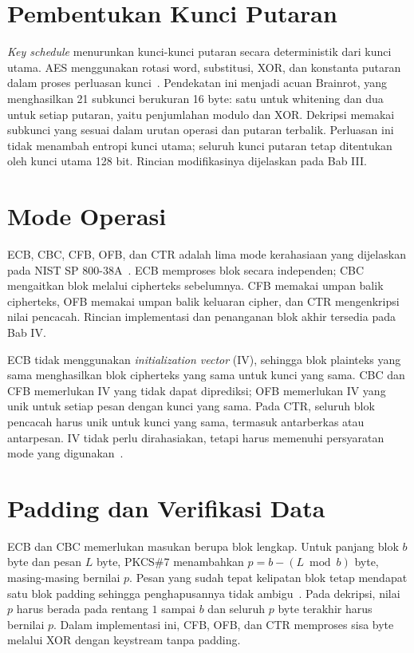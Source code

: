 \section{Pembentukan Kunci Putaran}
\textit{Key schedule} menurunkan kunci-kunci putaran secara deterministik
dari kunci utama. AES menggunakan rotasi word, substitusi, XOR, dan
konstanta putaran dalam proses perluasan kunci~\cite{aes}. Pendekatan ini
menjadi acuan Brainrot, yang menghasilkan 21 subkunci berukuran
16 byte: satu untuk whitening dan dua untuk setiap putaran, yaitu
penjumlahan modulo dan XOR. Dekripsi memakai subkunci yang sesuai
dalam urutan operasi dan putaran terbalik. Perluasan
ini tidak menambah entropi kunci utama; seluruh kunci putaran tetap
ditentukan oleh kunci utama 128 bit. Rincian modifikasinya dijelaskan
pada Bab III.

\section{Mode Operasi}
ECB, CBC, CFB, OFB, dan CTR adalah lima mode kerahasiaan yang dijelaskan
pada NIST SP 800-38A~\cite{mode}. ECB memproses blok secara independen;
CBC mengaitkan blok melalui cipherteks sebelumnya. CFB memakai umpan balik
cipherteks, OFB memakai umpan balik keluaran cipher, dan CTR mengenkripsi
nilai pencacah. Rincian implementasi dan penanganan blok akhir tersedia
pada Bab IV.

ECB tidak menggunakan \textit{initialization vector} (IV), sehingga blok
plainteks yang sama menghasilkan blok cipherteks yang sama untuk kunci
yang sama. CBC dan CFB memerlukan IV yang tidak dapat diprediksi;
OFB memerlukan IV yang unik untuk setiap pesan dengan kunci yang sama.
Pada CTR, seluruh blok pencacah harus unik untuk kunci yang sama,
termasuk antarberkas atau antarpesan. IV tidak perlu dirahasiakan, tetapi
harus memenuhi persyaratan mode yang digunakan~\cite{mode}.

\section{Padding dan Verifikasi Data}
ECB dan CBC memerlukan masukan berupa blok lengkap. Untuk panjang blok
$b$ byte dan pesan $L$ byte, PKCS\#7 menambahkan $p=b-(L\bmod b)$ byte,
masing-masing bernilai $p$. Pesan yang sudah tepat kelipatan blok tetap
mendapat satu blok padding sehingga penghapusannya tidak ambigu~\cite{padding}.
Pada dekripsi, nilai $p$ harus berada pada rentang $1$ sampai $b$ dan
seluruh $p$ byte terakhir harus bernilai $p$. Dalam implementasi ini,
CFB, OFB, dan CTR memproses sisa byte melalui XOR dengan keystream
tanpa padding.


